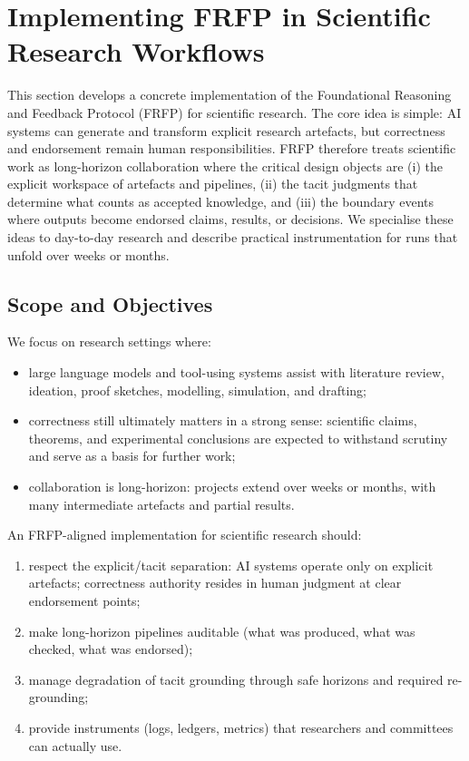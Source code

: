 \section{Implementing FRFP in Scientific Research Workflows}
\label{sec:frfp-science-implementation}

This section develops a concrete implementation of the Foundational Reasoning and Feedback Protocol
(FRFP) for scientific research. The core idea is simple: AI systems can generate and transform explicit
research artefacts, but correctness and endorsement remain human responsibilities. FRFP therefore treats
scientific work as long-horizon collaboration where the critical design objects are (i) the explicit
workspace of artefacts and pipelines, (ii) the tacit judgments that determine what counts as accepted
knowledge, and (iii) the boundary events where outputs become endorsed claims, results, or decisions.
We specialise these ideas to day-to-day research and describe practical instrumentation for runs that
unfold over weeks or months.

\subsection{Scope and Objectives}

We focus on research settings where:

\begin{itemize}
  \item large language models and tool-using systems assist with literature
        review, ideation, proof sketches, modelling, simulation, and drafting;
  \item correctness still ultimately matters in a strong sense:
        scientific claims, theorems, and experimental conclusions are expected
        to withstand scrutiny and serve as a basis for further work;
  \item collaboration is long-horizon: projects extend over weeks or months,
        with many intermediate artefacts and partial results.
\end{itemize}

An FRFP-aligned implementation for scientific research should:

\begin{enumerate}
\item respect the explicit/tacit separation:
        AI systems operate only on explicit artefacts; correctness authority resides in human judgment
        at clear endorsement points;
  \item make long-horizon pipelines auditable (what was produced, what was checked, what was endorsed);
  \item manage degradation of tacit grounding through safe horizons and required re-grounding;
  \item provide instruments (logs, ledgers, metrics) that researchers and committees can actually use.

\end{enumerate}

